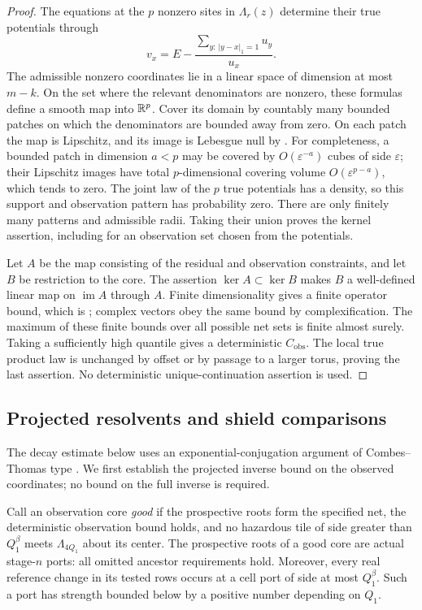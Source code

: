 \begin{proof}
The equations at the $p$ nonzero sites in $\Lambda_r(z)$ determine
their true potentials through
\[
 v_x=E-\frac{\sum_{y:\,|y-x|_1=1}u_y}{u_x}.
\]
The admissible nonzero coordinates lie in a linear space of dimension
at most $m-k$. On the set where the relevant denominators are nonzero,
these formulas define a smooth map into $\mathbb R^p$. Cover its domain by
countably many bounded patches on which the denominators are bounded
away from zero. On each patch the map is Lipschitz, and its image is
Lebesgue null by . For completeness, a
bounded patch in dimension $a<p$ may be covered by $O(\varepsilon^{-a})$
cubes of side $\varepsilon$; their Lipschitz images have total
$p$-dimensional covering volume $O(\varepsilon^{p-a})$, which tends
to zero.
The joint law of the $p$ true potentials has a density, so this support
and observation pattern has probability zero. There are only finitely
many patterns and admissible radii. Taking their union proves the
kernel assertion, including for an observation set chosen from the
potentials.

Let $A$ be the map consisting of the residual and observation
constraints, and let $B$ be restriction to the core. The assertion
$\ker A\subset\ker B$ makes $B$ a well-defined linear map on
$\operatorname{im}A$ through $A$. Finite dimensionality gives a finite
operator bound, which is ; complex
vectors obey the same bound by complexification.
The maximum of these finite bounds over all possible net sets is
finite almost surely. Taking a sufficiently high quantile gives a
deterministic $C_{\mathrm{obs}}$. The local true product law is
unchanged by offset or by passage to a larger torus, proving the last
assertion. No deterministic unique-continuation assertion is used.
\end{proof}

\subsection{Projected resolvents and shield comparisons}

The decay estimate below uses an exponential-conjugation argument of
Combes--Thomas type \cite{CombesThomas1973}. We first establish the
projected inverse bound on the observed coordinates; no bound on the
full inverse is required.

Call an observation core \emph{good} if the prospective roots form
the specified net, the deterministic observation bound holds, and no
hazardous tile of side greater than $Q_1^\beta$ meets
$\Lambda_{4Q_1}$ about its center. The prospective roots of a good
core are actual stage-$n$ ports: all omitted ancestor requirements
hold. Moreover, every real reference change in its tested rows occurs
at a cell port of side at most $Q_1^\beta$. Such a port has strength
bounded below by a positive number depending on $Q_1$.

